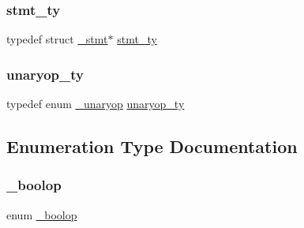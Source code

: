 \mbox{\label{_python-ast_8h_a39618071027b661bc03e8916e664e1a7}} 
\subsubsection{\texorpdfstring{stmt\_ty}{stmt\_ty}}
{\footnotesize\ttfamily typedef struct \mbox{\hyperlink{struct__stmt}{\+\_\+stmt}}$\ast$ \mbox{\hyperlink{_python-ast_8h_a39618071027b661bc03e8916e664e1a7}{stmt\+\_\+ty}}}

\mbox{\label{_python-ast_8h_a5a89f44a24bfbdb92d5a16b59468cffb}} 
\subsubsection{\texorpdfstring{unaryop\_ty}{unaryop\_ty}}
{\footnotesize\ttfamily typedef enum \mbox{\hyperlink{_python-ast_8h_a2fcb7a4a9d1e6c4815772f808b402048}{\+\_\+unaryop}}  \mbox{\hyperlink{_python-ast_8h_a5a89f44a24bfbdb92d5a16b59468cffb}{unaryop\+\_\+ty}}}



\subsection{Enumeration Type Documentation}
\mbox{\label{_python-ast_8h_a16067ed2b6546040536da29338709abf}} 
\subsubsection{\texorpdfstring{\_boolop}{\_boolop}}
{\footnotesize\ttfamily enum \mbox{\hyperlink{_python-ast_8h_a16067ed2b6546040536da29338709abf}{\+\_\+boolop}}}

